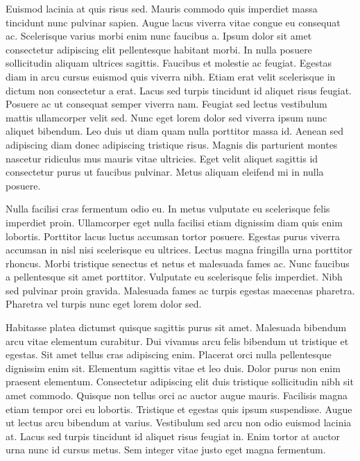 \documentclass[11pt,a4paper]{article}
\begin{document}
Euismod lacinia at quis risus sed. Mauris commodo quis imperdiet massa tincidunt nunc pulvinar sapien. Augue lacus viverra vitae congue eu consequat ac. Scelerisque varius morbi enim nunc faucibus a. Ipsum dolor sit amet consectetur adipiscing elit pellentesque habitant morbi. In nulla posuere sollicitudin aliquam ultrices sagittis. Faucibus et molestie ac feugiat. Egestas diam in arcu cursus euismod quis viverra nibh. Etiam erat velit scelerisque in dictum non consectetur a erat. Lacus sed turpis tincidunt id aliquet risus feugiat. Posuere ac ut consequat semper viverra nam. Feugiat sed lectus vestibulum mattis ullamcorper velit sed. Nunc eget lorem dolor sed viverra ipsum nunc aliquet bibendum. Leo duis ut diam quam nulla porttitor massa id. Aenean sed adipiscing diam donec adipiscing tristique risus. Magnis dis parturient montes nascetur ridiculus mus mauris vitae ultricies. Eget velit aliquet sagittis id consectetur purus ut faucibus pulvinar. Metus aliquam eleifend mi in nulla posuere.

Nulla facilisi cras fermentum odio eu. In metus vulputate eu scelerisque felis imperdiet proin. Ullamcorper eget nulla facilisi etiam dignissim diam quis enim lobortis. Porttitor lacus luctus accumsan tortor posuere. Egestas purus viverra accumsan in nisl nisi scelerisque eu ultrices. Lectus magna fringilla urna porttitor rhoncus. Morbi tristique senectus et netus et malesuada fames ac. Nunc faucibus a pellentesque sit amet porttitor. Vulputate eu scelerisque felis imperdiet. Nibh sed pulvinar proin gravida. Malesuada fames ac turpis egestas maecenas pharetra. Pharetra vel turpis nunc eget lorem dolor sed.

Habitasse platea dictumst quisque sagittis purus sit amet. Malesuada bibendum arcu vitae elementum curabitur. Dui vivamus arcu felis bibendum ut tristique et egestas. Sit amet tellus cras adipiscing enim. Placerat orci nulla pellentesque dignissim enim sit. Elementum sagittis vitae et leo duis. Dolor purus non enim praesent elementum. Consectetur adipiscing elit duis tristique sollicitudin nibh sit amet commodo. Quisque non tellus orci ac auctor augue mauris. Facilisis magna etiam tempor orci eu lobortis. Tristique et egestas quis ipsum suspendisse. Augue ut lectus arcu bibendum at varius. Vestibulum sed arcu non odio euismod lacinia at. Lacus sed turpis tincidunt id aliquet risus feugiat in. Enim tortor at auctor urna nunc id cursus metus. Sem integer vitae justo eget magna fermentum.
\end{document}
